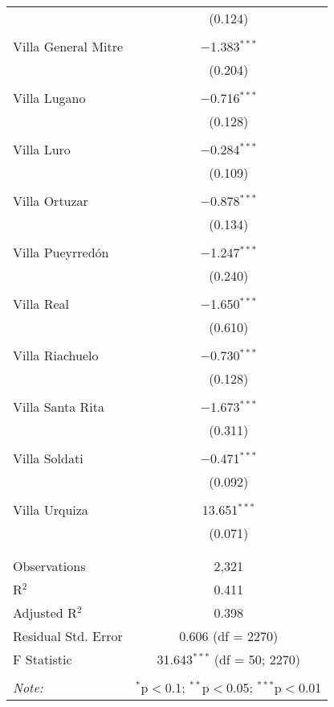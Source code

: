 \begin{table}[!htbp]
\begin{tabular}{@{\extracolsep{5pt}}lc}
  & (0.124) \\ 
  & \\ 
 Villa General Mitre & $-$1.383$^{***}$ \\ 
  & (0.204) \\ 
  & \\ 
 Villa Lugano & $-$0.716$^{***}$ \\ 
  & (0.128) \\ 
  & \\ 
 Villa Luro & $-$0.284$^{***}$ \\ 
  & (0.109) \\ 
  & \\ 
 Villa Ortuzar & $-$0.878$^{***}$ \\ 
  & (0.134) \\ 
  & \\ 
 Villa Pueyrredón & $-$1.247$^{***}$ \\ 
  & (0.240) \\ 
  & \\ 
 Villa Real & $-$1.650$^{***}$ \\ 
  & (0.610) \\ 
  & \\ 
 Villa Riachuelo & $-$0.730$^{***}$ \\ 
  & (0.128) \\ 
  & \\ 
 Villa Santa Rita & $-$1.673$^{***}$ \\ 
  & (0.311) \\ 
  & \\ 
 Villa Soldati & $-$0.471$^{***}$ \\ 
  & (0.092) \\ 
  & \\ 
 Villa Urquiza & 13.651$^{***}$ \\ 
  & (0.071) \\ 
  & \\ 
\hline \\[-1.8ex] 
Observations & 2,321 \\ 
R$^{2}$ & 0.411 \\ 
Adjusted R$^{2}$ & 0.398 \\ 
Residual Std. Error & 0.606 (df = 2270) \\ 
F Statistic & 31.643$^{***}$ (df = 50; 2270) \\ 
\hline 
\hline \\[-1.8ex] 
\textit{Note:}  & \multicolumn{1}{r}{$^{*}$p$<$0.1; $^{**}$p$<$0.05; $^{***}$p$<$0.01} \\ 
\end{tabular} 
\end{table} 
